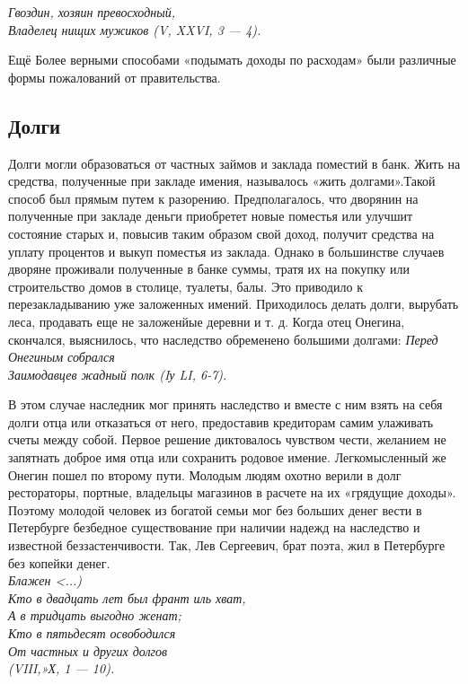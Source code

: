  \emph{Гвоздин, хозяин превосходный,\\
 Владелец нищих мужиков (V, XXVI, 3 — 4).}
 
Ещё  Более верными способами «подымать доходы по расходам» были различные формы пожалований от правительства. 

\subsection{Долги}
Долги могли образоваться от частных займов и заклада поместий в банк.
Жить на средства, полученные при закладе имения, называлось «жить долгами».Такой способ был прямым путем к разорению. Предполагалось, что дворянин на полученные при закладе деньги приобретет новые поместья или улучшит состояние старых и, повысив таким образом свой доход, получит средства на уплату процентов и выкуп поместья из заклада. Однако в большинстве случаев 
дворяне проживали полученные в банке суммы, тратя их на покупку или строительство домов в столице, туалеты, балы. Это приводило к перезакладыванию уже заложенных имений. Приходилось делать долги, вырубать леса, продавать еще не заложенйые деревни и т. д.
Когда отец Онегина, скончался, выяснилось, что наследство обременено большими долгами:
 \emph{Перед Онегиным собрался\\
 Заимодавцев жадный полк (Iу LI, 6-7).}
 
 В этом случае наследник мог принять наследство и вместе с ним взять на себя долги отца или отказаться от него, предоставив кредиторам самим улаживать 
счеты между собой. Первое решение диктовалось чувством чести, желанием не запятнать доброе имя отца или сохранить родовое имение.
Легкомысленный же Онегин пошел по второму пути.
Молодым людям охотно верили в долг рестораторы, портные, владельцы магазинов в расчете на их «грядущие доходы». Поэтому молодой человек из богатой семьи мог без больших денег вести в Петербурге безбедное существование при наличии надежд на наследство и известной беззастенчивости. Так, Лев Сергеевич, брат поэта, жил в Петербурге без копейки денег.
\\
\emph{ Блажен <...)\\
Кто в двадцать лет был франт иль хват,\\ 
А в тридцать выгодно женат;\\
Кто в пятьдесят освободился\\
 От частных и других долгов\\
 (VIII,»Х, 1 — 10).}
